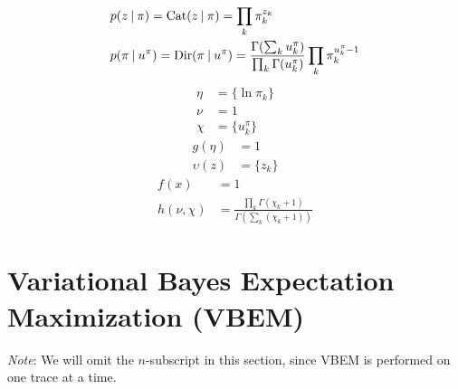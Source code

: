 \begin{align}
  &
  p(z \:|\: \pi) 
  =
  \mathrm{Cat}(z \:|\: \pi) = \prod_k \pi_k ^ {z_k}\\
  &
  p(\pi \:|\: u^\pi)
  =
  \mathrm{Dir}(\pi \:|\: u^\pi)
  = \frac{\Gamma(\sum_k u^\pi_k)}{\prod_k \Gamma(u^\pi_k)} \prod_k \pi_k ^ {u^\pi_k - 1}  
\end{align}
\begin{align}
  \eta &= \{ \ln \pi_k \} \\
  \nu &= 1 \\
  \chi &= \{ u^\pi_k \}
\end{align}
\begin{align}
  g(\eta) &= 1 \\
  \upsilon(z) &= \{ z_k \}
\end{align}
\begin{align}
  f(x) &= 1 \\
  h(\nu, \chi) &= \frac{\prod_k \Gamma(\chi_k+1)}{\Gamma(\sum_k (\chi_k + 1))}
\end{align}


\chapter{Variational Bayes Expectation Maximization (VBEM)}

\emph{Note}: We will omit the $n$-subscript in this section, since VBEM is performed on one trace at a time.


